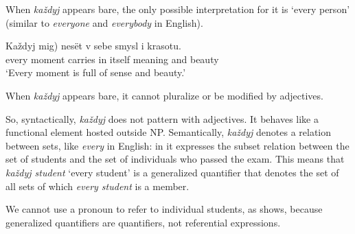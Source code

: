 \documentclass[output=paper,
colorlinks,
citecolor=brown,
newtxmath
]{langscibook}
\begin{document}
\noindent When \textit{každyj} appears bare, the only possible interpretation for it is `every person' (similar to \textit{everyone} and \textit{everybody} in English). 


\ea \gll Každyj \minsp{*(} mig) nesët v sebe smysl i krasotu.\\
every {} moment carries in itself meaning and beauty\\
\glt `Every moment is full of sense and beauty.'
\z

\noindent When \textit{každyj} appears bare, it cannot pluralize or be modified by adjectives.


\ea 
\z\z 

\noindent So, syntactically, \textit{každyj} does not pattern with adjectives. It behaves like a functional element hosted outside NP. 
Semantically, \textit{každyj} denotes a relation between sets, like \textit{every} in English: in  it expresses the subset relation between the set of students and the set of individuals who passed the exam.  This means that \textit{každyj student} `every student' is a generalized quantifier that denotes the set of all sets of which \textit{every student} is a member. 


\ea\label{41_ekzamen}
\z\z 

\noindent We cannot use a pronoun to refer to individual students, as  shows, because generalized quantifiers are quantifiers, not referential expressions.  
\end{document}
